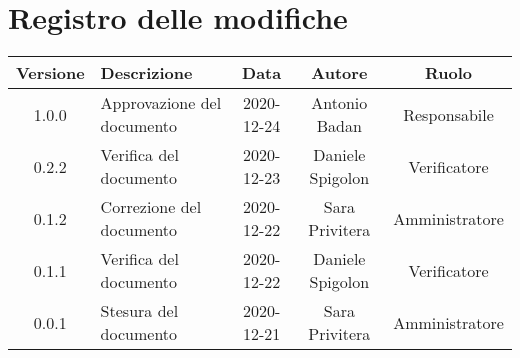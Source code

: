\section*{Registro delle modifiche}

\begin{center}
	\begin{longtable}{|c|p{5cm}|c|c|c|}
	\hline
	\rowcolor{lighter-grayer}
	\textbf{Versione} & \textbf{Descrizione} & \textbf{Data} & \textbf{Autore} & \textbf{Ruolo} \\
	\hline
	\endfirsthead


	\hline
	1.0.0 & Approvazione del documento & 2020-12-24 & Antonio Badan & Responsabile \\
	\hline
	0.2.2 & Verifica del documento & 2020-12-23 & Daniele Spigolon & Verificatore \\
	\hline
	0.1.2 & Correzione del documento & 2020-12-22 & Sara Privitera & Amministratore \\
	\hline
	0.1.1 & Verifica del documento & 2020-12-22 & Daniele Spigolon & Verificatore \\
	\hline
	0.0.1 & Stesura del documento & 2020-12-21 & Sara Privitera & Amministratore \\
	\hline
	
    
	\end{longtable}
\end{center}

